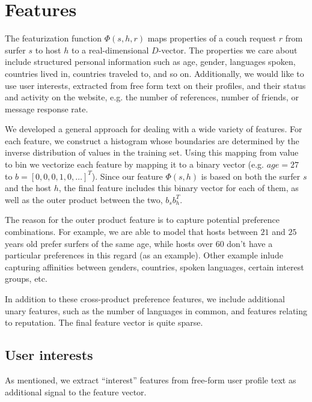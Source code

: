 \section{Features} \label{sec:features}

The featurization function $\Phi(s,h,r)$ maps properties of a couch request $r$ from surfer $s$ to host $h$ to a real-dimensional $D$-vector.
The properties we care about include structured personal information such as age, gender, languages spoken, countries lived in, countries traveled to, and so on.
Additionally, we would like to use user interests, extracted from free form text on their profiles, and their status and activity on the website, e.g. the number of references, number of friends, or message response rate.


We developed a general approach for dealing with a wide variety of features.
For each feature, we construct a histogram whose boundaries are determined by the inverse distribution of values in the training set.
Using this mapping from value to bin we vectorize each feature by mapping it to a binary vector (e.g. $age=27$ to $b=[0,0,0,1,0,\dots]^T$).
Since our feature $\Phi(s,h)$ is based on both the surfer $s$ and the host $h$, the final feature includes this binary vector for each of them, as well as the outer product between the two, $b_s b_h^T$.

The reason for the outer product feature is to capture potential preference combinations.
For example, we are able to model that hosts between $21$ and $25$ years old prefer surfers of the same age, while hosts over $60$ don't have a particular preferences in this regard (as an example).
Other example inlude capturing affinities between genders, countries, spoken languages, certain interest groups, etc.

In addition to these cross-product preference features, we include additional unary features, such as the number of languages in common, and features relating to reputation.
The final feature vector is quite sparse.

\subsection{User interests} \label{subsec:user_interests}

As mentioned, we extract ``interest'' features from free-form user profile text as additional signal to the feature vector.

